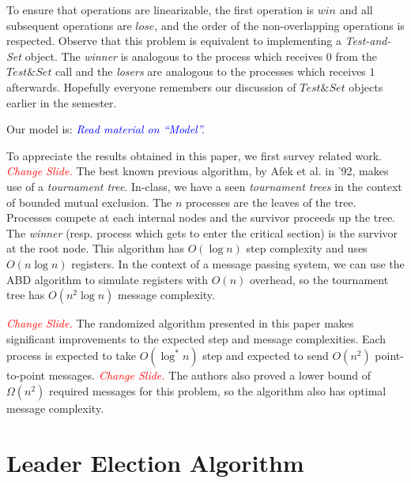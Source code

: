 \documentclass[
10pt, %
letterpaper, %
onecolumn, %
]{article}
\begin{document}
To ensure that operations are linearizable, the first operation is $win$ and all subsequent operations are $lose$, and the order of the non-overlapping operations is respected. Observe that this problem is equivalent to implementing a \emph{Test-and-Set} object. The \emph{winner} is analogous to the process which receives $0$ from the $Test\&Set$ call and the \emph{losers} are analogous to the processes which receives $1$ afterwards. Hopefully everyone remembers our discussion of $Test\&Set$ objects earlier in the semester.    

Our model is:
\textcolor{blue}{\emph{Read material on ``Model''.}}

To appreciate the results obtained in this paper, we first survey related work. \textcolor{red}{\emph{Change Slide.}} The best known previous algorithm, by Afek et al. in '92, makes use of a \emph{tournament tree}. In-class, we have a seen \emph{tournament trees} in the context of bounded mutual exclusion. The $n$ processes are the leaves of the tree. Processes compete at each internal nodes and the survivor proceeds up the tree. The \emph{winner} (resp. process which gets to enter the critical section) is the survivor at the root node. This algorithm has $O(\log n)$ step complexity and uses $O(n\log n)$ registers. In the context of a message passing system, we can use the ABD algorithm to simulate registers with $O(n)$ overhead, so the tournament tree has $O(n^2\log n)$ message complexity. 

\textcolor{red}{\emph{Change Slide.}} The randomized algorithm presented in this paper makes significant improvements to the expected step and message complexities. Each process is expected to take $O(\log^*n)$ step and expected to send $O(n^2)$ point-to-point messages. \textcolor{red}{\emph{Change Slide.}} The authors also proved a lower bound of $\Omega(n^2)$ required messages for this problem, so the algorithm also has optimal message complexity.


\section{Leader Election Algorithm}
\end{document}
